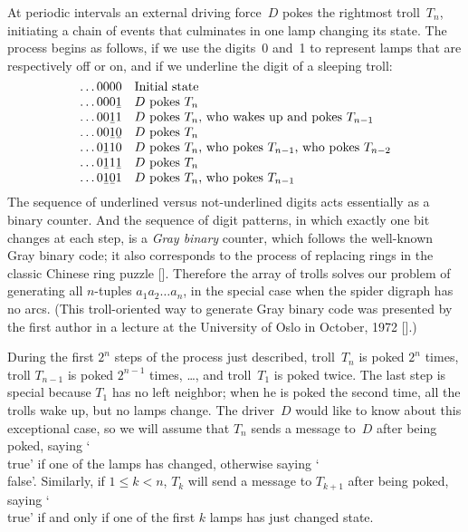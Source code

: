 At periodic intervals an external driving force~$D$ pokes
the rightmost troll~$T_n$, initiating a chain of events that
culminates in one lamp changing its state. The process
begins as follows, if we use the digits~0 and~1 to represent
lamps that are respectively off or on, and if we underline
the digit of a sleeping troll:
$$\vbox{\halign{\dots#\quad&#\hfil\cr
               0000&Initial state\cr
             000\b1&$D$ pokes $T_n$\cr
             00\b11&$D$ pokes $T_n$, who wakes up and pokes
$T_{n-1}$\cr
           00\b1\b0&$D$ pokes $T_n$\cr
             0\b110&$D$ pokes $T_n$, who pokes $T_{n-1}$, who
pokes $T_{n-2}$\cr
           0\b11\b1&$D$ pokes $T_n$\cr
           0\b1\b01&$D$ pokes $T_n$, who pokes $T_{n-1}$\cr}}$$
The sequence of underlined versus not-underlined digits acts essentially
as a binary counter. And the sequence of digit patterns, in which
exactly one bit changes at each step, is a {\it Gray
binary\/} counter, which follows the well-known Gray binary
code; it also corresponds to the process of replacing rings
in the classic Chinese ring puzzle [\Kiv]. Therefore the
array of trolls solves our problem of generating all $n$-tuples
$a_1a_2\ldots a_n$, in the special case when the spider digraph has no arcs.
(This troll-oriented way to generate Gray binary code was
presented by the first author in a lecture at the University
of Oslo in October, 1972 [\KO].)

During the first $2^n$ steps of the process just described,
troll~$T_n$ is poked $2^n$ times,
troll $T_{n-1}$ is poked $2^{n-1}$ times, \dots, and troll~$T_1$ is
poked twice. The last step is special because $T_1$ has no left neighbor;
when he is poked the second time, all the trolls wake up, but no lamps
change. The driver~$D$ would like to know about this exceptional case, so we
will assume that $T_n$ sends a message to~$D$ after being poked, saying
`\\{true}' if one of the lamps has changed, otherwise saying `\\{false}'.
Similarly, if $1\le k<n$, $T_k$ will send a message to $T_{k+1}$ after being
poked, saying `\\{true}' if and only if one of
the first $k$ lamps has just changed state.

